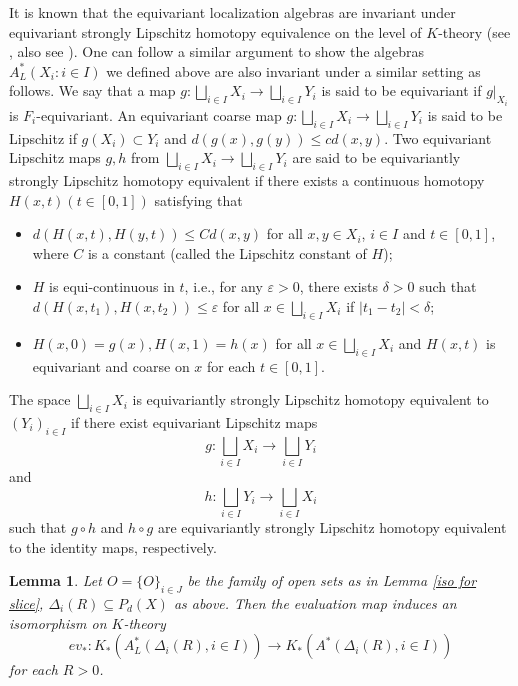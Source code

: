 \documentclass[11pt]{article}
\theoremstyle{definition}
\theoremstyle{plain}
\newtheorem{Lem}[Def]{Lemma}
\begin{document}
It is known that the equivariant localization algebras are invariant under equivariant strongly Lipschitz homotopy equivalence on the level of $K$-theory (see \cite[Lemma 6.5]{Yu2000}, also see \cite[Lemma 4.19]{FW2016}). One can follow a similar argument to show the algebras $A^*_L(X_i: i\in I)$ we defined above are also invariant under a similar setting as follows. We say that a map $g:\bigsqcup_{i\in I} X_i\to\bigsqcup_{i\in I} Y_i$ is said to be equivariant if $g|_{X_i}$ is $F_i$-equivariant. An equivariant coarse map $g:\bigsqcup_{i\in I} X_i\to\bigsqcup_{i\in I} Y_i$ is said to be Lipschitz if $g(X_i)\subset Y_i$ and $d(g(x),g(y))\leq c d(x,y)$. Two equivariant Lipschitz maps $g,h$ from $\bigsqcup_{i\in I} X_i\to\bigsqcup_{i\in I} Y_i$ are said to be equivariantly strongly Lipschitz homotopy equivalent if there exists a continuous homotopy $H(x,t)(t\in [0,1])$ satisfying that
\begin{itemize}
\item[(1)]$d(H(x,t),H(y,t))\leq Cd(x,y)$ for all $x,y\in X_i$, $i\in I$ and $t\in[0,1]$, where $C$ is a constant (called the Lipschitz constant of $H$);
\item[(2)]$H$ is equi-continuous in $t$, i.e., for any $\varepsilon>0$, there exists $\delta>0$ such that $d(H(x,t_1),H(x,t_2))\leq\varepsilon$ for all $x\in \bigsqcup_{i\in I}X_i$ if $|t_1-t_2|<\delta$;
\item[(3)]$H(x,0)=g(x),H(x,1)=h(x)$ for all $x\in \bigsqcup_{i\in I}X_i$ and $H(x,t)$ is equivariant and coarse on $x$ for each $t\in[0,1]$.
\end{itemize}
The space $\bigsqcup_{i\in I}X_i$ is equivariantly strongly Lipschitz homotopy equivalent to $(Y_i)_{i\in I}$ if there exist equivariant Lipschitz maps
$$g:\bigsqcup_{i\in I}X_i\to\bigsqcup_{i\in I}Y_i$$
and
$$h:\bigsqcup_{i\in I}Y_i\to\bigsqcup_{i\in I}X_i$$
such that $g\circ h$ and $h\circ g$ are equivariantly strongly Lipschitz homotopy equivalent to the identity maps, respectively.

\begin{Lem}\label{to single point}
Let $O=\{O\}_{i\in J}$ be the family of open sets as in Lemma \ref{iso for slice}, $\Delta_i(R)\subseteq P_d(X)$ as above. Then the evaluation map induces an isomorphism on $K$-theory
$$ev_*:K_*(A^*_L(\Delta_i(R),i\in I))\to K_*(A^*(\Delta_i(R),i\in I))$$
for each $R>0$.
\end{Lem}
\end{document}
